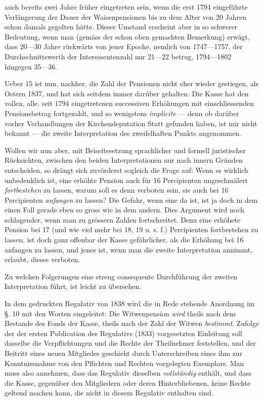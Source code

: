 auch bereits zwei Jahre früher eingetreten sein, wenn die erst 1794 eingeführte Verlängerung der Dauer der Waisenpensionen bis zu dem Alter von 20 Jahren schon damals gegolten hätte. Dieser Umstand erscheint aber in so schwerer Bedeutung, wenn man (gemäss der schon oben gemachten Bemerkung) erwägt, dass 20—30 Jahre rückwärts von jener Epoche, nemlich von 1747—1757, der Durchschnittswerth der Interessentenzahl nur 21—22 betrug, 1794—1802 hingegen 35—36.

Ueber 15 ist nun, nachher, die Zahl der Pensionen nicht eher wieder gestiegen, als Ostern 1837, und hat sich seitdem immer darüber gehalten. Die Kasse hat den vollen, alle. seit 1794 eingetretenen successiven Erhöhungen mit einschliessenden Pensionsbetrag fortgezahlt, und so wenigstens \textit{implicite} — denn ob darüber vorher Verhandlungen der Kirchendeputation Statt gefunden haben, ist mir nicht bekannt — die zweite Interpretation des zweifelhaften Punkts angenommen.

Wollen wir nun aber, mit Beiseitesetzung sprachlicher und formell juristischer Rücksichten, zwischen den beiden Interpretationen nur nach innern Gründen entscheiden, so drängt sich zuvörderst sogleich die Frage auf: Wenn es wirklich unbedenklich ist, eine erhöhte Pension auch für 16 Percipienten ungeschmälert \textit{fortbestehen} zu lassen, warum soll es denn verboten sein, sie auch bei 16 Percipienten \textit{anfangen} zu lassen? Die Gefahr, wenn eine da ist, ist ja doch in dem einen Fall gerade eben so gross wie in dem andern. Dies Argument wird noch schlagender, wenn man zu grössern Zahlen fortschreitet. Denn eine erhöhete Pension bei 17 (und wie viel mehr bei 18, 19 u. s. f.) Percipienten fortbestehen zu lassen, ist doch ganz offenbar der Kasse gefährlicher, als die Erhöhung bei 16 anfangen zu lassen, und jenes ist, wenn man die zweite Interpretation annimmt, erlaubt, dieses verboten.

Zu welchen Folgerungen eine streng consequente Durchführung der zweiten Interpretation führt, ist leicht zu übersehen.

In dem gedruckten Regulativ von 1838 wird die in Rede stehende Anordnung im §. 10 mit den Worten eingeleitet: Die Witwenpension \textit{wird} theils nach dem Bestande des Fonds der Kasse, theils nach der Zahl der Witwen \textit{bestimmt}. Zufolge der der ersten Publication des Regulativs (1833) vorgesetzten Einleitung soll dasselbe die Verpflichtungen und die Rechte der Theilnehmer feststellen, und der Beitritt eines neuen Mitgliedes geschieht durch Unterschreiben eines ihm zur Kenntnissnahme von den Pflichten und Rechten vorgelegten Exemplars. Man muss also annehmen, dass das Regulativ dieselben \textit{vollständig} enthält, und dass die Kasse, gegenüber den Mitgliedern oder deren Hinterbliebenen, keine Rechte geltend machen kann, die nicht in diesem Regulativ enthalten sind.

